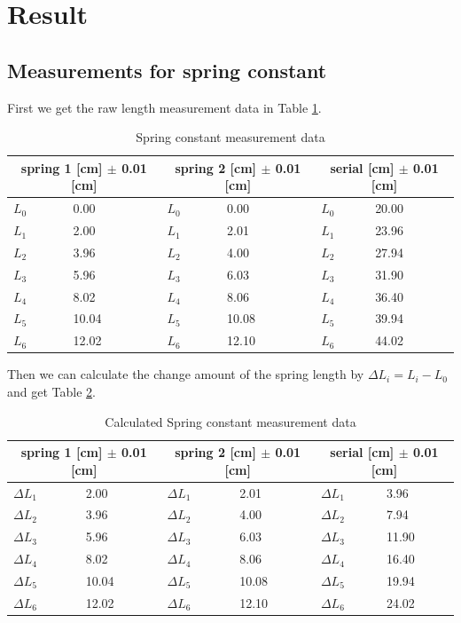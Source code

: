 \section{Result}

\subsection{Measurements for spring constant}

First we get the raw length measurement data in Table \ref{s1}.
\begin{table}[H]
	\centering
	\begin{tabular}{|p{0.7cm}|p{3cm}||p{0.7cm}|p{3cm}||p{0.7cm}|p{3cm}|}
	\hline
	\multicolumn{2}{|c|}{spring 1 [cm] $\pm$ 0.01 [cm]} &
	\multicolumn{2}{|c|}{spring 2 [cm] $\pm$ 0.01 [cm]} &
	\multicolumn{2}{|c|}{serial   [cm] $\pm$ 0.01 [cm]} \\ \hline
	$L_0$ & 0.00  & $L_0$ & 0.00  & $L_0$ & 20.00 \\ \hline
	$L_1$ & 2.00  & $L_1$ & 2.01  & $L_1$ & 23.96 \\ \hline
	$L_2$ & 3.96  & $L_2$ & 4.00  & $L_2$ & 27.94 \\ \hline
	$L_3$ & 5.96  & $L_3$ & 6.03  & $L_3$ & 31.90 \\ \hline
	$L_4$ & 8.02  & $L_4$ & 8.06  & $L_4$ & 36.40 \\ \hline
	$L_5$ & 10.04 & $L_5$ & 10.08 & $L_5$ & 39.94 \\ \hline
	$L_6$ & 12.02 & $L_6$ & 12.10 & $L_6$ & 44.02 \\ \hline
	\end{tabular}
	\caption{Spring constant measurement data}
	\label{s1}
\end{table}

Then we can calculate the change amount of the spring length by $\Delta L_i=L_i-L_0$ and get Table \ref{s2}.

\begin{table}[H]
	\centering
	\begin{tabular}{|p{0.7cm}|p{3cm}||p{0.7cm}|p{3cm}||p{0.7cm}|p{3cm}|}
	\hline
	\multicolumn{2}{|c|}{spring 1 [cm] $\pm$ 0.01 [cm]} &
	\multicolumn{2}{|c|}{spring 2 [cm] $\pm$ 0.01 [cm]} &
	\multicolumn{2}{|c|}{serial   [cm] $\pm$ 0.01 [cm]} \\ \hline
	$\Delta L_1$ & 2.00  & $\Delta L_1$ & 2.01  & $\Delta L_1$ & 3.96  \\ \hline
	$\Delta L_2$ & 3.96  & $\Delta L_2$ & 4.00  & $\Delta L_2$ & 7.94  \\ \hline
	$\Delta L_3$ & 5.96  & $\Delta L_3$ & 6.03  & $\Delta L_3$ & 11.90 \\ \hline
	$\Delta L_4$ & 8.02  & $\Delta L_4$ & 8.06  & $\Delta L_4$ & 16.40 \\ \hline
	$\Delta L_5$ & 10.04 & $\Delta L_5$ & 10.08 & $\Delta L_5$ & 19.94 \\ \hline
	$\Delta L_6$ & 12.02 & $\Delta L_6$ & 12.10 & $\Delta L_6$ & 24.02 \\ \hline
	\end{tabular}
	\caption{Calculated Spring constant measurement data}
	\label{s2}
\end{table}

